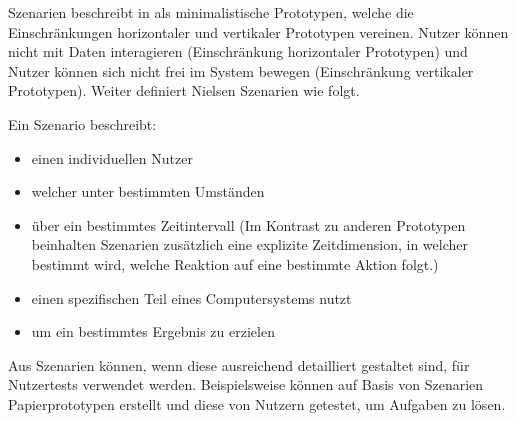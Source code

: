 Szenarien beschreibt \citeauthor{Nielsen1994} in \cite[S.~99]{Nielsen1994} als minimalistische Prototypen, welche die Einschränkungen horizontaler und vertikaler Prototypen vereinen. 
Nutzer können nicht mit Daten interagieren (Einschränkung horizontaler Prototypen) und Nutzer können sich nicht frei im System bewegen (Einschränkung vertikaler Prototypen).
Weiter definiert Nielsen Szenarien wie folgt. \cite[S.~100]{Nielsen1994} 
 
 Ein Szenario beschreibt:

\begin{itemize}
	\item einen individuellen Nutzer
	\item welcher unter bestimmten Umständen
	\item über ein bestimmtes Zeitintervall (Im Kontrast zu anderen Prototypen beinhalten Szenarien zusätzlich eine explizite Zeitdimension, in welcher bestimmt wird, welche Reaktion auf eine bestimmte Aktion folgt.)
	\item einen spezifischen Teil eines Computersystems nutzt
	\item um ein bestimmtes Ergebnis zu erzielen
\end{itemize}

Aus Szenarien können, wenn diese ausreichend detailliert gestaltet sind, für Nutzertests verwendet werden. Beispielsweise können auf Basis von Szenarien Papierprototypen erstellt und diese von Nutzern getestet, um Aufgaben zu lösen. \cite[S.~101]{Nielsen1994}





